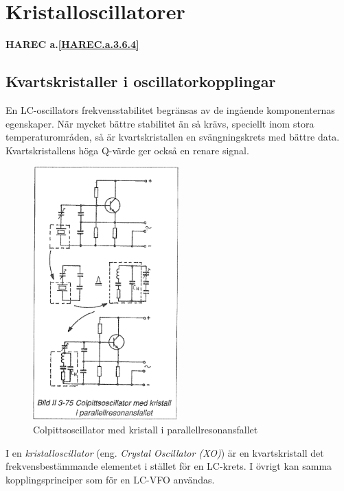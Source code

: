 \section{Kristalloscillatorer}
\textbf{HAREC a.\ref{HAREC.a.3.6.4}\label{myHAREC.a.3.6.4}}

\subsection{Kvartskristaller i oscillatorkopplingar}

En LC-oscillators frekvensstabilitet begränsas av de ingående
komponenternas egenskaper. När mycket bättre stabilitet än så krävs,
speciellt inom stora temperaturområden, så är kvartskristallen en
svängningskrets med bättre data. Kvartskristallens höga Q-värde ger
också en renare signal.

\begin{figure}
  \includegraphics[width=0.5\textwidth]{images/bild_2_3-75}
  \caption{Colpittsoscillator med kristall i parallellresonansfallet}
  \label{fig:BildII3-75}
\end{figure}

I en \emph{kristalloscillator} (eng. \emph{Crystal Oscillator (XO)}) är en kvartskristall
det frekvensbestämmande elementet i stället för en LC-krets. I övrigt
kan samma kopplingsprinciper som för en LC-VFO användas.

